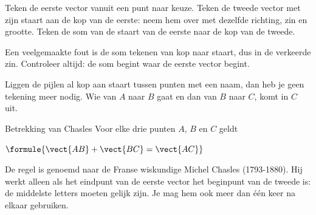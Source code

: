 \begin{werkwijze}
Teken de eerste vector vanuit een punt naar keuze. Teken de tweede vector met zijn staart aan de kop van de eerste: neem hem over met dezelfde richting, zin en grootte. Teken de som van de staart van de eerste naar de kop van de tweede.
\end{werkwijze}

Een veelgemaakte fout is de som tekenen van kop naar staart, dus in de verkeerde zin. Controleer altijd: de som begint waar de eerste vector begint.

\begin{oefeningen}
\end{oefeningen}

Liggen de pijlen al kop aan staart tussen punten met een naam, dan heb je geen tekening meer nodig. Wie van $A$ naar $B$ gaat en dan van $B$ naar $C$, komt in $C$ uit.

\begin{theorie}
\begin{stelling}{Betrekking van Chasles}
Voor elke drie punten $A$, $B$ en $C$ geldt

\vspace{1mm}
\qquad $\formule{\vect{AB} + \vect{BC} = \vect{AC}}$
\end{stelling}
\end{theorie}

De regel is genoemd naar de Franse wiskundige Michel Chasles (1793-1880). Hij werkt alleen als het eindpunt van de eerste vector het beginpunt van de tweede is: de middelste letters moeten gelijk zijn. Je mag hem ook meer dan één keer na elkaar gebruiken.




